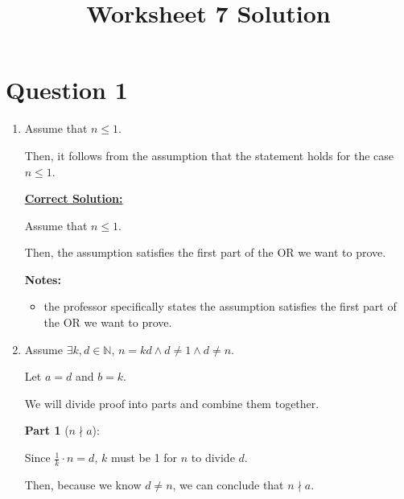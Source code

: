 \documentclass[12pt]{article}
\begin{document}
\title{Worksheet 7 Solution}
\maketitle

\section*{Question 1}
\begin{enumerate}
    \item

    Assume that $n \leq 1$.

    \bigskip

    Then, it follows from the assumption that the statement holds for the case
    $n \leq 1$.

    \begin{mdframed}
        \underline{\textbf{Correct Solution:}}

        Assume that $n \leq 1$.

        \bigskip

        Then, the assumption satisfies the first part of the OR we want to prove.

    \end{mdframed}

    \bigskip

    \textbf{Notes:}
    \begin{itemize}
        \item the professor specifically states the assumption satisfies the first
        part of the OR we want to prove.

    \end{itemize}

    \item

    Assume $\exists k,d \in \mathbb{N}$, $n = kd \land d \neq 1 \land d \neq n$.

    \bigskip

    Let $a = d$ and $b = k$.

    \bigskip

    We will divide proof into parts and combine them together.

    \bigskip

    \textbf{Part 1} ($n \nmid a$):

    Since $\frac{1}{k} \cdot n = d$, $k$ must be 1 for $n$ to divide $d$.

    \bigskip

    Then, because we know $d \neq n$, we can conclude that $n \nmid a$.


\end{enumerate}
\end{document}
